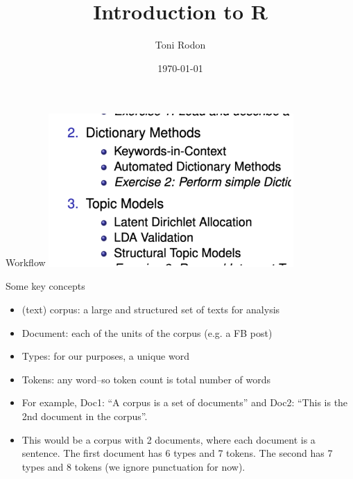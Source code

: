 \documentclass{beamer}
\title{Introduction to R}
\date{\today}
\author{Toni Rodon}
\institute{R introduction, scraping and text analysis (UB) \\ Universitat Pompeu Fabra \\ \faGlobe  \url{www.tonirodon.cat} \\ \faTwitter \href{https://twitter.com/tonirodon}{@tonirodon} }
\begin{document}
  \maketitle


 \begin{frame}{Workflow}
 \includegraphics[width=0.7\textwidth]{../Figures/grimmer.png}
 \end{frame}



\begin{frame}{Some key concepts}
\begin{itemize}[<+->]
\item (text) corpus: a large and structured set of texts for analysis
\item Document: each of the units of the corpus (e.g. a FB post)
\item Types: for our purposes, a unique word
\item Tokens: any word--so token count is total number of words
\item For example, Doc1: ``A corpus is a set of documents'' and Doc2: ``This is the 2nd document in the corpus''.
\item This would be a corpus with 2 documents, where each document is a sentence. The first document has 6 types and 7 tokens. The second has 7 types and 8 tokens (we ignore punctuation for now).
 \end{itemize} 
\end{frame}
\end{document}
